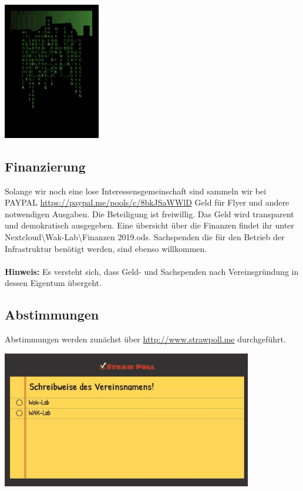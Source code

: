 \begin{minipage}[t]{0.5\textwidth}
  \centering
  \includegraphics[height=6cm]{pictures/FlyerRueckseite.jpg}
  \label{img:FlyerRueckseite}
\end{minipage}

\subsection{Finanzierung}
Solange wir noch eine lose Interessensgemeinschaft sind sammeln wir bei PAYPAL \url{https://paypal.me/pools/c/8bkJSaWWlD} Geld für Flyer und andere notwendigen Ausgaben. Die Beteiligung ist freiwillig. Das Geld wird transparent und demokratisch ausgegeben. Eine übersicht über die Finanzen findet ihr unter Nextcloud\textbackslash Wak-Lab\textbackslash Finanzen 2019.ods. Sachspenden die für den Betrieb der Infrastruktur benötigt werden, sind ebenso willkommen. \\
\ \\
\textbf{Hinweis:} Es versteht sich, dass Geld- und Sachspenden nach Vereinsgründung in dessen Eigentum übergeht.\\

\subsection{Abstimmungen}
Abstimmungen werden zunächst über \url{http://www.strawpoll.me} durchgeführt.\\

\begin{minipage}[t]{\textwidth}
  \centering
  \includegraphics[height=6cm]{pictures/StrawPoll.png}
  \label{img:StrawPoll}
\end{minipage}
